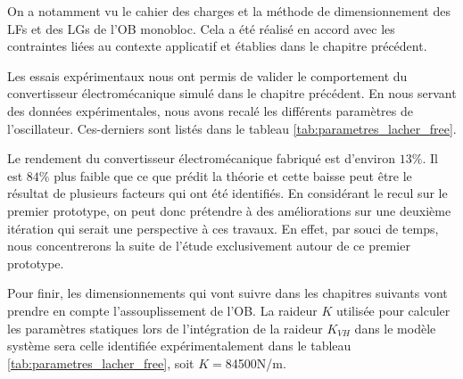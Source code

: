 On a notamment vu le cahier des charges et la méthode de dimensionnement des LFs et des LGs de l'OB monobloc. Cela a été réalisé en accord avec les contraintes liées au contexte applicatif et établies dans le chapitre précédent.

Les essais expérimentaux nous ont permis de valider le comportement du convertisseur électromécanique simulé dans le chapitre précédent. En nous servant des données expérimentales, nous avons recalé les différents paramètres de l'oscillateur. Ces-derniers sont listés dans le tableau \ref{tab:parametres_lacher_free}.

Le rendement du convertisseur électromécanique fabriqué est d'environ $13\%$. Il est $84\%$ plus faible que ce que prédit la théorie et cette baisse peut être le résultat de plusieurs facteurs qui ont été identifiés. En considérant le recul sur le premier prototype, on peut donc prétendre à des améliorations sur une deuxième itération qui serait une perspective à ces travaux. En effet, par souci de temps, nous concentrerons la suite de l'étude exclusivement autour de ce premier prototype.

Pour finir, les dimensionnements qui vont suivre dans les chapitres suivants vont prendre en compte l'assouplissement de l'OB. La raideur $K$ utilisée pour calculer les paramètres statiques lors de l'intégration de la raideur $K_{VH}$ dans le modèle système sera celle identifiée expérimentalement dans le tableau \ref{tab:parametres_lacher_free}, soit $K=$84500N/m.

    